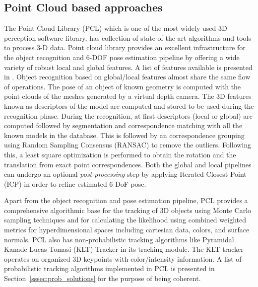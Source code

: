 \subsection{Point Cloud based approaches}
\label{ssec:pcl}
The Point Cloud Library (PCL) \cite{rusu20113d} which is one of the most widely used 3D perception software library, has collection of state-of-the-art algorithms and tools to process 3-D data. 
	Point cloud library provides an excellent infrastructure for the object recognition and 6-DOF pose estimation pipeline by offering a wide variety of robust local and global features. A list of features available is presented in \cite{aldoma2012point}. Object recognition based on global/local features almost share the same flow of operations. 
The pose of an object of known geometry is computed with the point clouds of the meshes generated by a virtual depth camera. The 3D features known as descriptors of the model are computed and stored to be used during the recognition phase.  During the recognition, at first descriptors (local or global) are computed followed by segmentation and correspondence matching with all the known models in the database. This is followed by an correspondence grouping using Random Sampling Consensus (RANSAC) to remove the outliers. Following this, a least square optimization is performed to obtain the rotation and the translation from exact point correspondences. Both the global and local pipelines can undergo an optional \emph{post processing} step by applying Iterated Closest Point (ICP) in order to refine estimated 6-DoF pose.

Apart from the object recognition and pose estimation pipeline, PCL provides a comprehensive algorithmic base for the tracking of 3D objects using Monte Carlo sampling techniques \cite{RUeda2012} and for calculating the likelihood using combined weighted metrics for hyperdimensional spaces including cartesian data, colors, and surface normals. PCL also has non-probabilistic tracking algorithms like Pyramidal Kanade Lucas Tomasi (KLT) Tracker in its tracking module. The KLT tracker operates on organized 3D keypoints with color/intensity information. A list of probabilistic tracking algorithms implemented in PCL is presented in Section~\ref{sssec:prob_solutions} for the purpose of being coherent.
